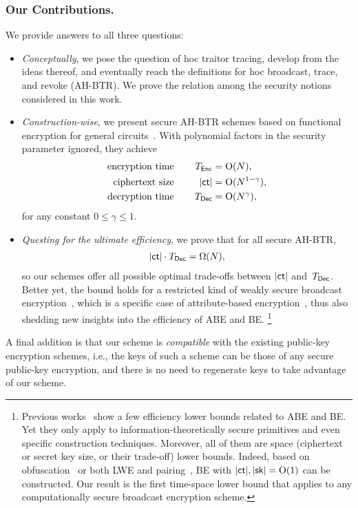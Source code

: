 \subsubsection{Our Contributions.}
We provide answers to all three questions:
\begin{itemize}
\item \emph{Conceptually}, we pose the question of \ad hoc traitor tracing,
develop from the ideas thereof, and
eventually reach the definitions for \ad hoc broadcast, trace, and revoke (AH-BTR).
We prove the relation among the security notions considered in this work.
\item \emph{Construction-wise},
we present secure AH-BTR schemes based on functional encryption for general circuits~\cite{TCC:BonSahWat11}.
With polynomial factors in the security parameter ignored,
they achieve
\begin{align*}
\textup{encryption time}\qquad\qquad\mathllap{T_\Enc}&{}=\bigO(N),\\
\textup{ciphertext size}\qquad\qquad\mathllap{|\ct|}&{}=\bigO(N^{1-\gamma}),\\
\textup{decryption time}\qquad\qquad\mathllap{T_\Dec}&{}=\bigO(N^\gamma),
\end{align*}
for any constant ${0\leq\gamma\leq 1}$.
\item \emph{Questing for the ultimate efficiency},
we prove that for all secure AH-BTR,
\begin{align*}
|\ct|\cdot\TDec=\bigOmega(N),
\end{align*}
so our schemes offer all possible optimal trade-offs between $|\ct|$ and~$\TDec$.
Better yet, the bound holds for a restricted kind of weakly secure broadcast encryption~\cite{C:FiaNao93},
which is a specific case of attribute-based encryption~\cite{EC:SahWat05,CCS:GPSW06},
thus also shedding new insights into the efficiency of ABE and BE.%
\footnote{Previous works~\cite{EC:BluCre94,EC:LubSta98,AC:KYDB98,AFRICACRYPT:AusKre08,AC:KatYer09,C:GayKerWee15,ITC:DLY21} show a few efficiency lower bounds related to ABE and BE.
Yet they only apply to information-theoretically secure primitives and even specific construction techniques.
Moreover, all of them are space (ciphertext or secret key size, or their trade-off) lower bounds.
Indeed, based on obfuscation~\cite{C:BonWatZha14} or both LWE and pairing~\cite{EC:AgrYam20}, BE with ${|\ct|,|\sk|=\bigO(1)}$ can be constructed.
Our result is the first time-space lower bound that applies to any computationally secure broadcast encryption scheme.}
\end{itemize}
A final addition is that our scheme is \emph{compatible} with the existing public-key encryption schemes,
i.e., the keys of such a scheme can be those of any secure public-key encryption, and
there is no need to regenerate keys to take advantage of our scheme.
